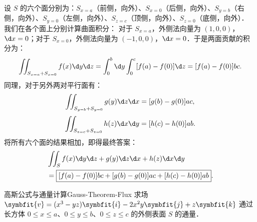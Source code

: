 \begin{solution}
    设 $S$ 的六个面分别为：$S_{x=a}$（前侧，向外）、$S_{x=0}$（后侧，向外）、$S_{y=b}$（右侧，向外）、$S_{y=0}$（左侧，向外）、$S_{z=c}$（顶侧，向外）、$S_{z=0}$（底侧，向外）．
    我们在各个面上分别计算曲面积分：
    对于 $S_{x=a}$，外侧法向量为 $(1, 0, 0)$，$\d x = 0$；对于 $S_{x=0}$，外侧法向量为 $(-1, 0, 0)$，$\d x = 0$．于是两面贡献的积分为：
    \begin{equation}
        \label{eq:box-1}
        \iint_{S_{x=a} + S_{x=0}} f(x) \d y \d z = \int_0^b \d y \int_0^c [f(a) - f(0)] \d z = [f(a) - f(0)] b c.
    \end{equation}
    同理，对于另外两对平行面有：
    \begin{equation}
        \label{eq:box-2}
        \iint_{S_{y=b} + S_{y=0}} g(y) \d z \d x = [g(b) - g(0)] a c,
    \end{equation}
    \begin{equation}
        \label{eq:box-3}
        \iint_{S_{z=c} + S_{z=0}} h(z) \d x \d y = [h(c) - h(0)] a b.
    \end{equation}
    将所有六个面的结果相加，即得最终答案：
    \begin{equation}
        \label{eq:box-4}
        \begin{aligned}
             & \iint_{S} f(x) \d y \d z + g(y) \d z \d x + h(z) \d x \d y           \\
             & = \boxed{[f(a) - f(0)] b c + [g(b) - g(0)] a c + [h(c) - h(0)] a b}.
        \end{aligned}
    \end{equation}
\end{solution}

\begin{problem}{高斯公式与通量计算}{Gauss-Theorem-Flux}
    求场 $\symbfit{v} = (x^3 - yz)\symbfit{i} - 2x^2y\symbfit{j} + z\symbfit{k}$ 通过长方体 $0 \le x \le a$、$0 \le y \le b$、$0 \le z \le c$ 的外侧表面 $S$ 的通量．
\end{problem}

